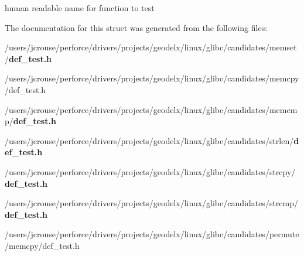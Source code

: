 human readable name for function to test 

The documentation for this struct was generated from the following files:\begin{CompactItemize}
\item 
/users/jcrouse/perforce/drivers/projects/geodelx/linux/glibc/candidates/memset/{\bf def\_\-test.h}\item 
/users/jcrouse/perforce/drivers/projects/geodelx/linux/glibc/candidates/memcpy/def\_\-test.h\item 
/users/jcrouse/perforce/drivers/projects/geodelx/linux/glibc/candidates/memcmp/{\bf def\_\-test.h}\item 
/users/jcrouse/perforce/drivers/projects/geodelx/linux/glibc/candidates/strlen/{\bf def\_\-test.h}\item 
/users/jcrouse/perforce/drivers/projects/geodelx/linux/glibc/candidates/strcpy/{\bf def\_\-test.h}\item 
/users/jcrouse/perforce/drivers/projects/geodelx/linux/glibc/candidates/strcmp/{\bf def\_\-test.h}\item 
/users/jcrouse/perforce/drivers/projects/geodelx/linux/glibc/candidates/permute/memcpy/def\_\-test.h\end{CompactItemize}
